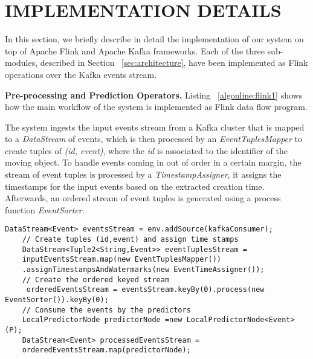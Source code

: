 

\section{IMPLEMENTATION DETAILS}
\label{sec:impl}
In this section, we briefly describe in detail the implementation of our system on top of Apache Flink and Apache Kafka frameworks. Each of the three sub-modules, described in Section ~\ref{sec:architecture}, have been implemented as Flink operations over the Kafka events stream. 


\textbf{Pre-processing and Prediction Operators.} Listing ~\ref{algonline:flink1} shows how the main workflow of the system is implemented as Flink data flow program.

The system ingests the input events stream from a Kafka cluster that is mapped to a \textit{DataStream} of events, which is then processed by an \textit{EventTuplesMapper} to create tuples of \textit{(id, event)}, where the \textit{id} is associated to the identifier of the moving object. To handle events  coming in out of order in a certain margin, the stream of event tuples  is processed by a \textit{TimestampAssigner}, it assigns the timestamps for the input events based on the extracted creation time. Afterwards,  an ordered stream of event tuples is generated using a process function \textit{EventSorter}.
	\begin{lstlisting}[caption={Flink pipeline for local predictors workflow},label={algonline:flink1},frame=single]
	DataStream<Event> eventsStream = env.addSource(kafkaConsumer);	
	// Create tuples (id,event) and assign time stamps 
	DataStream<Tuple2<String,Event>> eventTuplesStream =
	inputEventsStream.map(new EventTuplesMapper())
	.assignTimestampsAndWatermarks(new EventTimeAssigner());	
	// Create the ordered keyed stream 
	 orderedEventsStream = eventsStream.keyBy(0).process(new EventSorter()).keyBy(0);	
	// Consume the events by the predictors 
	LocalPredictorNode predictorNode =new LocalPredictorNode<Event>(P);
	DataStream<Event> processedEventsStream =
	orderedEventsStream.map(predictorNode);
	\end{lstlisting}
	
